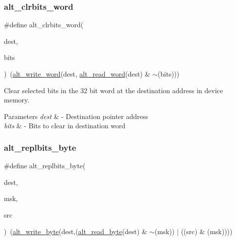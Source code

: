 \subsubsection{\texorpdfstring{alt\_clrbits\_word}{alt\_clrbits\_word}}
{\footnotesize\ttfamily \#define alt\+\_\+clrbits\+\_\+word(\begin{DoxyParamCaption}\item[{}]{dest,  }\item[{}]{bits }\end{DoxyParamCaption})~(\mbox{\hyperlink{group__ALT__SOCAL__UTIL__RW__FUNC_gac135ea12921af3aeb033c92ddb82c66c}{alt\+\_\+write\+\_\+word}}(dest, \mbox{\hyperlink{group__ALT__SOCAL__UTIL__RW__FUNC_ga77db76edef8b90adb75eb837325b5d11}{alt\+\_\+read\+\_\+word}}(dest) \& $\sim$(bits)))}

Clear selected bits in the 32 bit word at the destination address in device memory. 
\begin{DoxyParams}{Parameters}
{\em dest} & -\/ Destination pointer address \\
\hline
{\em bits} & -\/ Bits to clear in destination word \\
\hline
\end{DoxyParams}
\mbox{\label{group__ALT__SOCAL__UTIL__SC__FUNC_ga960265a618c5dcf7ab016cbc54c0d3f6}} 
\subsubsection{\texorpdfstring{alt\_replbits\_byte}{alt\_replbits\_byte}}
{\footnotesize\ttfamily \#define alt\+\_\+replbits\+\_\+byte(\begin{DoxyParamCaption}\item[{}]{dest,  }\item[{}]{msk,  }\item[{}]{src }\end{DoxyParamCaption})~(\mbox{\hyperlink{group__ALT__SOCAL__UTIL__RW__FUNC_ga48f504d9c370e45073a9c5e142e1036d}{alt\+\_\+write\+\_\+byte}}(dest,(\mbox{\hyperlink{group__ALT__SOCAL__UTIL__RW__FUNC_ga1bf0798969c891f5885170ff2de3ac88}{alt\+\_\+read\+\_\+byte}}(dest) \& $\sim$(msk)) $\vert$ ((src) \& (msk))))}

